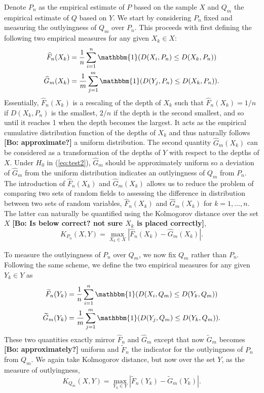 \documentclass[12pt]{article}
\newcommand{\bl}[1]{\color{Red}\textbf{[Bo: #1]}\normalcolor}
\begin{document}
Denote $P_n$ as the empirical estimate of $P$ based on the sample $X$ and $Q_m$ the empirical estimate of $Q$ based on $Y$. We start by considering $P_n$ fixed and measuring the outlyingness of $Q_m$ over $P_n$. This proceeds with first defining the following two empirical measures for any given $X_k \in X$:
\begin{align}
  \widehat{F}_n(X_k) &= \frac{1}{n}\sum_{i=1}^n \mathbbm{1}(D(X_i, P_n) \leq D(X_k, P_n)) \label{eq:Fn}\\
    \widehat{G}_m(X_k) &= \frac{1}{m}\sum_{j=1}^m \mathbbm{1}(D(Y_j, P_n) \leq D(X_k, P_n)) \label{eq:Gn}.
\end{align}
Essentially, $\widehat{F}_n(X_k)$ is a rescaling of the depth of $X_k$ such that $\widehat{F}_n(X_k)=1/n$ if $D(X_k, P_n)$ is the smallest,  $2/n$ if the depth is the second smallest, and so until it reaches 1 when the depth becomes the largest. It acts as the empirical cumulative distribution function of the depths of $X_k$ and thus naturally follows \bl{approximate?} a uniform distribution.  
The second quantity $\widehat{G}_m(X_k)$ can be considered as a transformation of the depths of $Y$ with respect to the depths of $X$.
Under $H_0$ in (\ref{eq:test2}), $\widehat{G}_m$ should be approximately uniform so a deviation of $\widehat{G}_m$ from the uniform distribution indicates an outlyingness of $Q_m$ from $P_n$. The introduction of $ \widehat{F}_n(X_k)$ and $\widehat{G}_m(X_k)$ allows us to reduce the problem of comparing two sets of random fields to assessing the difference in distribution between two sets of random variables, $\widehat{F}_n(X_k)$ and $\widehat{G}_m(X_k)$ for $k=1,\ldots, n$. The latter can naturally be quantified using the Kolmogorov distance over the set $X$ \bl{Is below correct? not sure $X_k$ is placed correctly},
\begin{equation}\label{eq:KPn}
K_{P_n}(X, Y) = \max_{X_k \in X}|\widehat{F}_n(X_k) - \widehat{G}_m(X_k)|.
\end{equation}

To measure the outlyingness of $P_n$ over $Q_m$, we now fix $Q_m$ rather than $P_n$. Following the same scheme, we define the two empirical measures for any given $Y_k \in Y$ as
\begin{align*}
    \widetilde{F}_n(Y_k) &= \frac{1}{n}\sum_{i=1}^n \mathbbm{1}(D(X_i, Q_m) \leq D(Y_k, Q_m)) \\
    \widetilde{G}_m(Y_k) &= \frac{1}{m}\sum_{j=1}^m \mathbbm{1}(D(Y_j, Q_m) \leq D(Y_k, Q_m)).
\end{align*}
 These two quantities exactly mirror $\widehat{F}_n$ and $\widehat{G}_m$ except that now $\widetilde{G}_m$ becomes \bl{approximately?} uniform and $\widetilde{F}_n$ the indicator for the outlyingness of $P_n$ from $Q_m$. We again take Kolmogorov distance, but now over the set $Y$, as the measure of outlyingness,
\[
K_{Q_m} (X, Y) = \max_{Y_k \in Y}|\widetilde{F}_n(Y_k) - \widetilde{G}_m(Y_k)|.
\]
\end{document}
